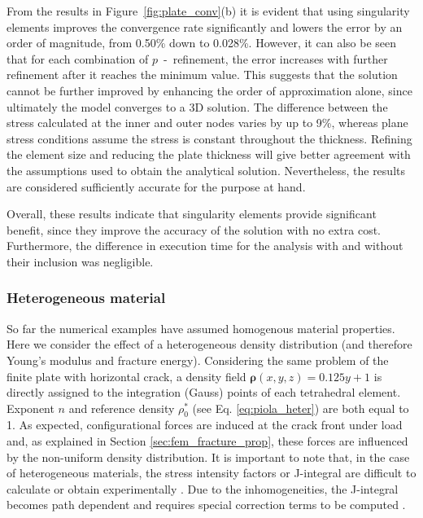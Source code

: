 \documentclass[onecolumn]{svjour3}
\begin{document}
From the results in Figure~\ref{fig:plate_conv}(b) it is evident that using singularity elements improves the convergence rate significantly and lowers the error by an order of magnitude, from 0.50\% down to 0.028\%. 
However, it can also be seen that for each combination of $p$~-~refinement, the error increases with further refinement after it reaches the minimum value. 
This suggests that the solution cannot be further improved by enhancing the order of approximation alone, since ultimately the model converges to a 3D solution. The difference between the stress calculated at the inner and outer nodes varies by up to 9\%, whereas plane stress conditions assume the stress is constant throughout the thickness. Refining the element size and reducing the plate thickness will give better agreement with the assumptions used to obtain the analytical solution. Nevertheless, the results are considered sufficiently accurate for the purpose at hand. 

Overall, these results indicate that singularity elements provide significant benefit, since they improve the accuracy of the solution with no extra cost.
Furthermore, the difference in execution time for the analysis with and without their inclusion was negligible. 

\subsubsection{Heterogeneous material}

So far the numerical examples have assumed homogenous material properties. Here we consider the effect of a heterogeneous density distribution (and therefore Young's modulus and fracture energy). 
Considering the same problem of the finite plate with horizontal crack, a density field $\mathbf{\rho}(x,y,z) = 0.125y + 1$ is directly assigned to the integration (Gauss) points of each tetrahedral element. Exponent $n$ and reference density $\rho_{0}^{\ast}$ (see Eq. \ref{eq:piola_heter}) are both equal to 1.
As expected, configurational forces are induced at the crack front under load and, as explained in Section \ref{sec:fem_fracture_prop}, these forces are influenced by the non-uniform density distribution. 
It is important to note that, in the case of heterogeneous materials, the stress intensity factors or J-integral are difficult to calculate or obtain experimentally \citep{fischer_problems_2014}. Due to the inhomogeneities, the J-integral becomes path dependent and requires special correction terms to be computed \citep{eischen_fracture_1987, chang_extension_2002}. 
\end{document}
